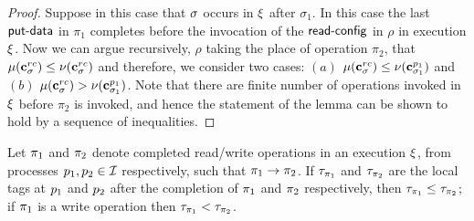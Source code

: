 \begin{proof}
 Suppose 
in this case that $\sigma$ occurs in $\EX$ after $\sigma_1$. In this case the 
   last $\act{put-data}$ in $\pi_1$ completes   before the invocation of the  $\act{read-config}$ in $\rho$ in execution $\EX$. 
   Now we can argue recursively, $\rho$ taking the place of operation $\pi_2$,  that $\mu(\mathbf{c}^{rc}_{{\sigma}}) \leq \nu(\mathbf{c}^{rc}_{{\sigma}})$ and 
therefore,  we consider  two cases:
$(a)$ $\mu(\mathbf{c}^{rc}_{\sigma}) \leq \nu(\mathbf{c}^{p_1}_{{\sigma}_1})$ and 
$(b)$ $\mu(\mathbf{c}^{rc}_{\sigma}) > \nu(\mathbf{c}^{p_1}_{{\sigma}_1})$. 
Note that there are finite number of operations  invoked in $\EX$  before $\pi_2$ is invoked, and hence  the statement of the lemma can be shown to hold by a sequence of inequalities.
\end{proof}

\begin{lemma} %
	 Let $\pi_1$ and $\pi_2$ denote completed read/write operations in an execution $\EX$, from processes $p_1,p_2\in\mathcal{I}$ respectively, such that $\pi_1\rightarrow\pi_2$. If $\tau_{\pi_1}$ and $\tau_{\pi_2}$ are the 
	local tags at $p_1$ and $p_2$ after the completion of $\pi_1$ and $\pi_2$ respectively, then $\tau_{\pi_1} \leq \tau_{\pi_2}$; if $\pi_1$ is a write operation then $\tau_{\pi_1}  < \tau_{\pi_2}$.
\end{lemma}

